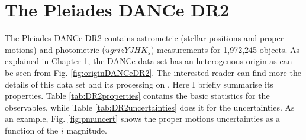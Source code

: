 %

\section{The Pleiades DANCe DR2}
\label{sect:DR2}

The Pleiades DANCe DR2 contains astrometric (stellar positions and proper motions) and photometric ($ugrizYJHK_s$) measurements for 1,972,245 objects. As explained in Chapter 1, the DANCe data set has an heterogenous origin as can be seen from Fig. \ref{fig:originDANCeDR2}. The interested reader can find more the details of this data set and its processing on \citet{Bouy2013}. Here I briefly summarise its properties. Table \ref{tab:DR2properties} contains the basic statistics for the observables, while Table \ref{tab:DR2uncertainties} does it for the uncertainties. As an example, Fig. \ref{fig:pmuncert} shows the proper motions uncertainties as a function of the $i$ magnitude.


